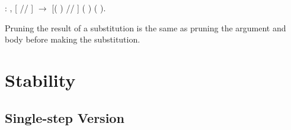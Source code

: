 \documentclass[12pt]{report}
\begin{document}
\begin{coqdoccode}
\coqdocemptyline
\coqdocindent{0.50em}
  : \coqdockw{\ensuremath{\forall}}     ,\coqdoceol
\coqdocindent{2.00em}
[ // ]    \ensuremath{\rightarrow}\coqdoceol
\coqdocindent{2.00em}
[(  ) // ] (  )  (  ).\coqdoceol
\coqdocemptyline
\end{coqdoccode}
Pruning the result of a substitution is the same as pruning the
argument and body before making the substitution. 

\section{Stability}



\subsection{Single-step Version}
\end{document}
